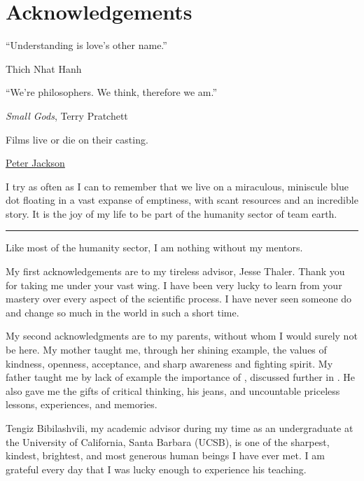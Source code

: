 \section*{Acknowledgements}

\epigraph{``Understanding is love's other name.''}{Thich Nhat Hanh}
\vspace{-20pt}
\epigraph{``We're philosophers. We think, therefore we am.''}{\textit{Small Gods}, Terry Pratchett}
\vspace{-20pt}
\epigraph{Films live or die on their casting.}{\href{https://youtu.be/W5bB7-jg_4M?list=PLomTW5B3fAMXJsqE_HDiMpdOdcfAk_Lqc&t=146}{Peter Jackson}}

I try as often as I can to remember that we live on a miraculous, miniscule blue dot floating in a vast expanse of emptiness, with scant resources and an incredible story.
%
It is the joy of my life to be part of the humanity sector of team earth.

\vspace{10pt}
\hrule

\begin{center}
Like most of the humanity sector, I am nothing without my mentors.
\end{center}


My first acknowledgements are to my tireless advisor, Jesse Thaler.
%
Thank you for taking me under your vast wing.
%
I have been very lucky to learn from your mastery over every aspect of the scientific process.
%
I have never seen someone do and change so much in the world in such a short time.



My second acknowledgments are to my parents, without whom I would surely not be here.
%
My mother taught me, through her shining example, the values of kindness, openness, acceptance, and sharp awareness and fighting spirit.
%
My father taught me by lack of example the importance of , discussed further in .
%
He also gave me the gifts of critical thinking, his jeans, and uncountable priceless lessons, experiences, and memories.



Tengiz Bibilashvili, my academic advisor during my time as an undergraduate at the University of California, Santa Barbara (UCSB), is one of the sharpest, kindest, brightest, and most generous human beings I have ever met.
%
I am grateful every day that I was lucky enough to experience his teaching.



